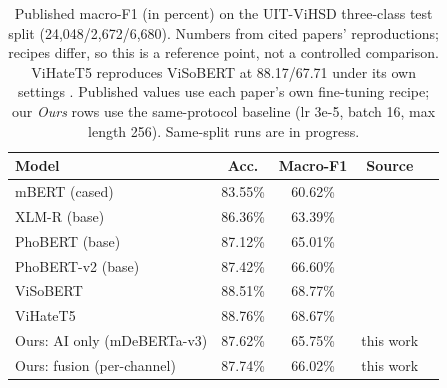 \begin{table}[ht]
\centering
\scriptsize
\setlength{\tabcolsep}{3pt}
\caption{Published macro-F1 (in percent) on the UIT-ViHSD three-class test split
(24{,}048/2{,}672/6{,}680). Numbers from cited papers' reproductions; recipes differ, so this is a
reference point, not a controlled comparison. ViHateT5 reproduces ViSoBERT at
88.17/67.71 under its own settings \cite{nguyen2024vihatet5}. Published values use each paper's own fine-tuning recipe; our \textit{Ours} rows use the same-protocol baseline (lr 3e-5, batch 16, max length 256). Same-split runs are in progress.}
\label{tab:external-comparison}
\begin{tabular}{lcccc}
\toprule
Model & Acc. & Macro-F1 & Source \\
\midrule
mBERT (cased)            & 83.55\% & 60.62\% & \cite{nguyen2023visobert} \\
XLM-R (base)             & 86.36\% & 63.39\% & \cite{nguyen2023visobert} \\
PhoBERT (base)           & 87.12\% & 65.01\% & \cite{nguyen2023visobert} \\
PhoBERT-v2 (base)        & 87.42\% & 66.60\% & \cite{nguyen2024vihatet5} \\
ViSoBERT                 & 88.51\% & 68.77\% & \cite{nguyen2023visobert} \\
ViHateT5                 & 88.76\% & 68.67\% & \cite{nguyen2024vihatet5} \\
\midrule
Ours: AI only (mDeBERTa-v3) & 87.62\% & 65.75\% & this work \\
Ours: fusion (per-channel)  & 87.74\% & 66.02\% & this work \\
\bottomrule
\end{tabular}
\end{table}
